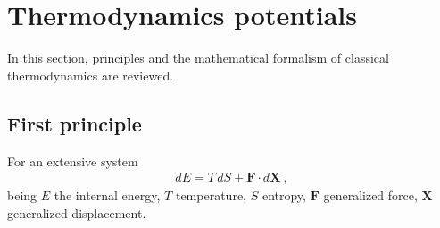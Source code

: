 \documentclass[letterpaper,10pt,english]{jupyterBook}
\begin{document}
\sphinxstepscope


\chapter{Thermodynamics potentials}
\label{\detokenize{ch/potentials:thermodynamics-potentials}}\label{\detokenize{ch/potentials:classical-thermodynamics-potentials}}\label{\detokenize{ch/potentials::doc}}
\sphinxAtStartPar
In this section, principles and the mathematical formalism of classical thermodynamics are reviewed.


\section{First principle}
\label{\detokenize{ch/potentials:first-principle}}
\sphinxAtStartPar
For an extensive system
\begin{equation*}
\begin{split}d E = T \, d S + \mathbf{F} \cdot d \mathbf{X} \ ,\end{split}
\end{equation*}
\sphinxAtStartPar
being \(E\) the internal energy, \(T\) temperature, \(S\) entropy, \(\mathbf{F}\) generalized force, \(\mathbf{X}\) generalized displacement.
\end{document}
